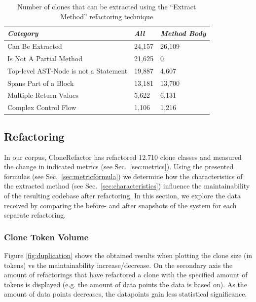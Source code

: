 \documentclass[sigconf,review, table]{acmart}
\begin{document}
\begin{table}[H]
\centering
\begin{tabular}{@{}lll@{}}
\toprule
\textit{\textbf{Category}} & \textit{\textbf{All}} & \textit{\textbf{Method Body}} \\ \midrule
Can Be Extracted & 24,157 & 26,109 \\
Is Not A Partial Method & 21,625 & 0 \\
Top-level AST-Node is not a Statement & 19,887 & 4,607 \\
Spans Part of a Block & 13,181 & 13,700 \\
Multiple Return Values & 5,622 & 6,131 \\
Complex Control Flow & 1,106 & 1,216 \\ \bottomrule
\end{tabular}
\caption{Number of clones that can be extracted using the ``Extract Method'' refactoring technique}
\label{tab:refactorability}
\end{table}

\subsection{Refactoring}
In our corpus, CloneRefactor has refactored 12.710 clone classes and measured the change in indicated metrics (see Sec.~\ref{sec:metrics}). Using the presented formulas (see Sec.~\ref{sec:metricformula}) we determine how the characteristics of the extracted method (see Sec.~\ref{sec:characteristics}) influence the maintainability of the resulting codebase after refactoring. In this section, we explore the data received by comparing the before- and after snapshots of the system for each separate refactoring.

\subsubsection{Clone Token Volume}
Figure \ref{fig:duplication} shows the obtained results when plotting the clone size (in tokens) vs the maintainability increase/decrease. On the secondary axis the amount of refactorings that have refactored a clone with the specified amount of tokens is displayed (e.g. the amount of data points the data is based on). As the amount of data points decreases, the datapoints gain less statistical significance.
\end{document}
